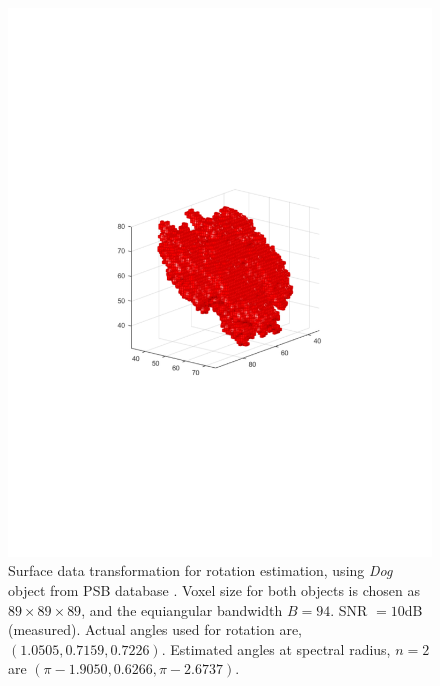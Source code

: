 \documentclass{UCF_ETD}
\begin{document}
\begin{figure}[H]
\begin{center}
\includegraphics[scale=0.5]{RobustRegistration/VoxelizedNoisyRotatedDog}
\caption{Surface data transformation for rotation estimation, using \emph{Dog} object from PSB database \cite{Princeton2004}. Voxel size for both objects is chosen as $89 \times 89 \times 89$, and the equiangular bandwidth $B = 94$.  SNR $= 10$dB (measured). Actual angles used for rotation are, $ (1.0505 , 0.7159 ,  0.7226)$. Estimated angles at spectral radius, $n=2$ are $(\pi- 1.9050, 0.6266, \pi- 2.6737)$. }
\label{NoisyRegistrationWithDogObject.fig}
\end{center}
\end{figure}
\end{document}

